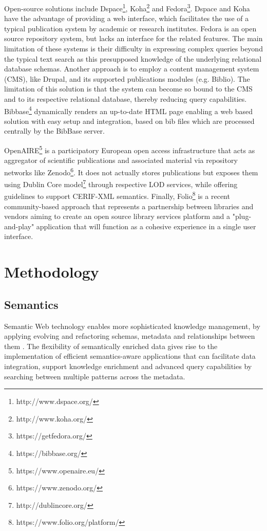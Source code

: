 \documentclass[runningheads,a4paper]{llncs}
\begin{document}
Open-source solutions include Dspace\footnote{ http://www.dspace.org/}, Koha\footnote{ http://www.koha.org/} and Fedora\footnote{ https://getfedora.org/}. Dspace and Koha have the advantage of providing a web interface, which facilitates the use of a typical publication system by academic or research institutes.  Fedora is an open source repository system, but lacks an interface for the related features. The main limitation of these systems is their difficulty in expressing complex queries beyond the typical text search as this presupposed knowledge of the underlying relational database schemas. Another approach is to employ a content management system (CMS), like Drupal, and its supported publications modules (e.g. Biblio). The limitation of this solution is that the system can become so bound to the CMS and to its respective relational database, thereby reducing query capabilities. Bibbase\footnote{ https://bibbase.org/} dynamically renders an up-to-date HTML page enabling a web based solution with easy setup and integration, based on bib files which are processed centrally by the BibBase server.

OpenAIRE\footnote{ https://www.openaire.eu/}  is a participatory European open access infrastructure that acts as aggregator of scientific publications and associated material via repository networks like Zenodo\footnote{ https://www.zenodo.org/}. It does not actually stores publications but exposes them using Dublin Core model\footnote{ http://dublincore.org/} through respective LOD services, while offering guidelines to support CERIF-XML semantics. Finally, Folio\footnote{  https://www.folio.org/platform/} is a recent community-based approach that represents a partnership between libraries and vendors aiming to create an open source library services platform and a "plug-and-play" application that will function as a cohesive experience in a single user interface.

\section{Methodology}

\subsection{Semantics}

Semantic Web technology enables more sophisticated knowledge management, by applying evolving and refactoring schemas, metadata and relationships between them  \cite{_Ref490663279}. The flexibility of semantically enriched data gives rise to the implementation of efficient semantics-aware applications that can facilitate data integration, support knowledge enrichment and advanced query capabilities by searching between multiple patterns across the metadata. 
\end{document}
